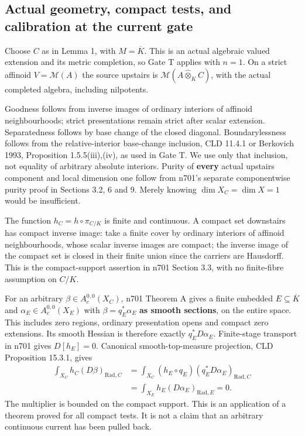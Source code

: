 \documentclass[
  11pt,
]{article}
\begin{document}
\subsection{Actual geometry, compact tests, and calibration at the
current
gate}\label{actual-geometry-compact-tests-and-calibration-at-the-current-gate}

Choose \(C\) as in Lemma 1, with \(M=\overline K\). This is an actual
algebraic valued extension and its metric completion, so Gate T applies
with \(n=1\). On a strict affinoid \(V=\mathcal M(A)\) the source
upstairs is \(\mathcal M(A\widehat\otimes_K C)\), with the actual
completed algebra, including nilpotents.

Goodness follows from inverse images of ordinary interiors of affinoid
neighbourhoods; strict presentations remain strict after scalar
extension. Separatedness follows by base change of the closed diagonal.
Boundarylessness follows from the relative-interior base-change
inclusion, CLD 11.4.1 or Berkovich 1993, Proposition 1.5.5(iii),(iv), as
used in Gate T. We use only that inclusion, not equality of arbitrary
absolute interiors. Purity of \textbf{every} actual upstairs component
and local dimension one follow from n701's separate componentwise purity
proof in Sections 3.2, 6 and 9. Merely knowing \(\dim X_C=\dim X=1\)
would be insufficient.

The function \(h_C=h\circ\pi_{C/K}\) is finite and continuous. A compact
set downstairs has compact inverse image: take a finite cover by
ordinary interiors of affinoid neighbourhoods, whose scalar inverse
images are compact; the inverse image of the compact set is closed in
their finite union since the carriers are Hausdorff. This is the
compact-support assertion in n701 Section 3.3, with no finite-fibre
assumption on \(C/K\).

For an arbitrary \(\beta\in A_c^{0,0}(X_C)\), n701 Theorem A gives a
finite embedded \(E\subseteq\overline K\) and
\(\alpha_E\in A_c^{0,0}(X_E)\) with \(\beta=q_E^*\alpha_E\) \textbf{as
smooth sections}, on the entire space. This includes zero regions,
ordinary presentation opens and compact zero extensions. Its smooth
Hessian is therefore exactly \(q_E^*D\alpha_E\). Finite-stage transport
in n701 gives \(D[h_E]=0\). Canonical smooth-top-measure projection, CLD
Proposition 15.3.1, gives \[
 \begin{aligned}
 \int_{X_C}h_C(D\beta)_{\mathrm{Rad},C}
 &=\int_{X_C}(h_E\circ q_E)(q_E^*D\alpha_E)_{\mathrm{Rad},C}\\
 &=\int_{X_E}h_E(D\alpha_E)_{\mathrm{Rad},E}=0.
 \end{aligned}                                         \tag{5}
\] The multiplier is bounded on the compact support. This is an
application of a theorem proved for all compact tests. It is not a claim
that an arbitrary continuous current has been pulled back.
\end{document}
